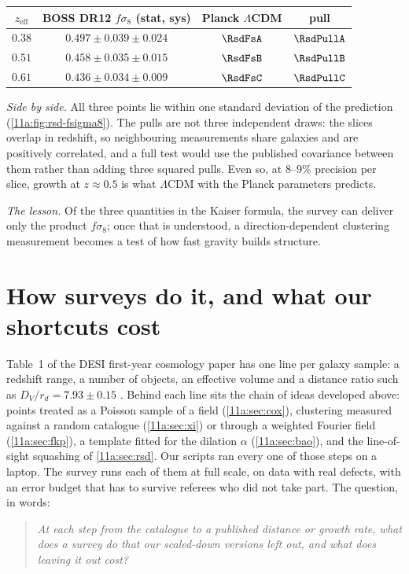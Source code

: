 \begin{center}
\small
\begin{tabular}{cccc}
\hline
$z_{\mathrm{eff}}$ & BOSS DR12 $f\sigma_8$ (stat, sys) & Planck $\Lambda$CDM & pull \\
\hline
$0.38$ & $0.497\pm0.039\pm0.024$ & $\RsdFsA$ & $\RsdPullA$ \\
$0.51$ & $0.458\pm0.035\pm0.015$ & $\RsdFsB$ & $\RsdPullB$ \\
$0.61$ & $0.436\pm0.034\pm0.009$ & $\RsdFsC$ & $\RsdPullC$ \\
\hline
\end{tabular}
\end{center}

\emph{Side by side.} All three points lie within one standard deviation of the
prediction (\cref{11a:fig:rsd-fsigma8}). The pulls are not three independent
draws: the slices overlap in redshift, so neighbouring measurements share
galaxies and are positively correlated, and a full test would use the published
covariance between them rather than adding three squared pulls. Even so, at
$8$--$9\%$ precision per slice, growth at $z\approx0.5$ is what $\Lambda$CDM
with the Planck parameters predicts.

\emph{The lesson.} Of the three quantities in the Kaiser formula, the survey can
deliver only the product $f\sigma_8$; once that is understood, a direction-dependent
clustering measurement becomes a test of how fast gravity builds structure.
\section{How surveys do it, and what our shortcuts cost}
\label{11a:sec:research}

Table~1 of the DESI first-year cosmology paper has one line per galaxy sample: a
redshift range, a number of objects, an effective volume and a distance ratio
such as $D_V/r_d=7.93\pm0.15$ . Behind each line sits
the chain of ideas developed above: points treated as a Poisson sample of a field
(\cref{11a:sec:cox}), clustering measured against a random catalogue
(\cref{11a:sec:xi}) or through a weighted Fourier field (\cref{11a:sec:fkp}), a
template fitted for the dilation $\alpha$ (\cref{11a:sec:bao}), and the
line-of-sight squashing of \cref{11a:sec:rsd}. Our scripts ran every one of those
steps on a laptop. The survey runs each of them at full scale, on data with
real defects, with an error budget that has to survive referees who did not take
part. The question, in words:
\begin{quote}
\emph{At each step from the catalogue to a published distance or growth rate,
what does a survey do that our scaled-down versions left out, and what does
leaving it out cost?}
\end{quote}

